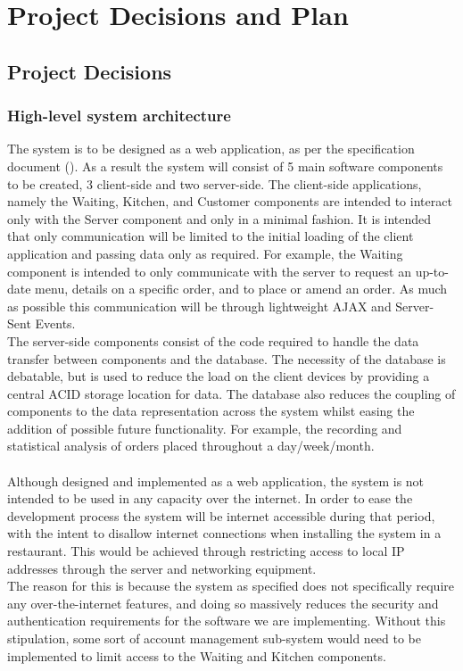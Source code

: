 \documentclass[11pt, a4paper]{report}
\begin{document}
\chapter{Project Decisions and Plan}
\nocite{NoRisks}

\pagebreak
\minitoc
\pagebreak

\section{Project Decisions}\label{sec:Decisions}

\subsection{High-level system architecture}\label{subsec:architecture}

The system is to be designed as a web application, as per the specification document (\cite{Specification}). As a result the system will consist of 5 main software components to be created, 3 client-side and two server-side. The client-side applications, namely the Waiting, Kitchen, and Customer components are intended to interact only with the Server component and only in a minimal fashion.  It is intended that only communication will be limited to the initial loading of the client application and passing data only as required. For example, the Waiting component is intended to only communicate with the server to request an up-to-date menu, details on a specific order, and to place or amend an order. As much as possible this communication will be through lightweight AJAX and Server-Sent Events.\\
The server-side components consist of the code required to handle the data transfer between components and the database. The necessity of the database is debatable, but is used to reduce the load on the client devices by providing a central ACID storage location for data. The database also reduces the coupling of components to the data representation across the system whilst easing the addition of possible future functionality. For example, the recording and statistical analysis of orders placed throughout a day/week/month.\\
\\
Although designed and implemented as a web application, the system is not intended to be used in any capacity over the internet. In order to ease the development process the system will be internet accessible during that period, with the intent to disallow internet connections when installing the system in a restaurant. This would be achieved through restricting access to local IP addresses through the server and networking equipment.\\
The reason for this is because the system as specified does not specifically require any over-the-internet features, and doing so massively reduces the security and authentication requirements for the software we are implementing. Without this stipulation, some sort of account management sub-system would need to be implemented to limit access to the Waiting and Kitchen components.
\end{document}
